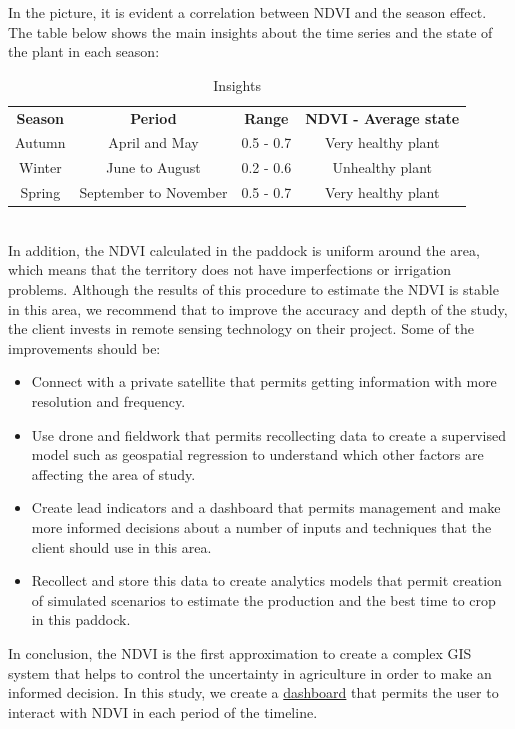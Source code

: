 \documentclass[fleqn,10pt]{wlscirep}
\begin{document}
In the picture, it is evident a correlation between NDVI and the season effect. The table below shows the main insights about the time series and the state of the plant in each season: 
\begin{table}[h]
\centering
\begin{tabular}{cccc}
\hline
\textbf{Season} & \textbf{Period}                & \textbf{Range}     & \textbf{NDVI - Average state} 
\\
Autumn & April and May         & 0.5 - 0.7 & Very healthy plant   \\
Winter & June to August        & 0.2 - 0.6 & Unhealthy plant      \\
Spring & September to November & 0.5 - 0.7 & Very healthy plant 
\\
\hline
\end{tabular}
\caption{Insights} 
\label{table:ventanasminutos}
\end{table}
\\
In addition, the NDVI calculated in the paddock is uniform around the area, which means that the territory does not have imperfections or irrigation problems. Although the results of this procedure to estimate the NDVI is stable in this area, we recommend that to improve the accuracy and depth of the study, the client invests in remote sensing technology on their project. Some of the improvements should be: 
\begin{itemize}
\setlength\itemsep{0em}
\item Connect with a private satellite that permits getting information with more resolution and frequency. 
\item Use drone and fieldwork that permits recollecting data to create a supervised model such as geospatial regression to understand which other factors are affecting the area of study.  
\item Create lead indicators and a dashboard that permits management and make more informed decisions about a number of inputs and techniques that the client should use in this area. 
\item Recollect and store this data to create analytics models that permit creation of simulated scenarios to estimate the production and the best time to crop in this paddock. 
\end{itemize}
In conclusion, the NDVI is the first approximation to create a complex GIS system that helps to control the uncertainty in agriculture in order to make an informed decision. In this study, we create a \href{https://ndvi.proactivepreventionplatform.com}{dashboard} that permits the user to interact with NDVI in each period of the timeline. 
\end{document}
